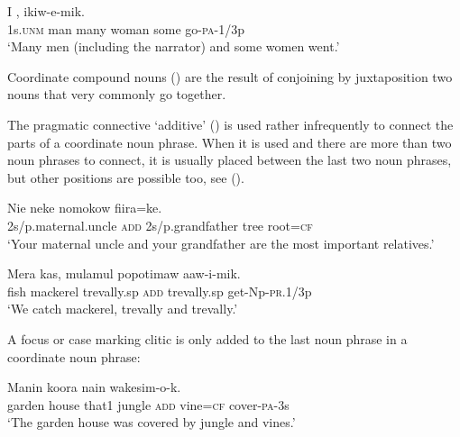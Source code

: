 \ea%
\label{ex:x811}
\gll I   ,     ikiw-e-mik. \\
  1s.\textsc{unm}  man  many  woman  some  go-\textsc{pa}-1/3p    \\
\glt`Many men (including the narrator) and some women went.'
\z





Coordinate compound nouns () are the result of conjoining by juxtaposition two nouns that very commonly go together. 

The pragmatic connective  `additive' () is used rather infrequently to connect the parts of a coordinate noun phrase. When it is used and there are more than two noun phrases to connect, it is usually placed between the last two noun phrases, but other positions are possible too, see (). 

\ea%
\label{ex:x812}
\gll Nie    neke  nomokow  fiira=ke. \\
    2s/p.maternal.uncle  \textsc{add}  2s/p.grandfather  tree  root=\textsc{cf}  \\
\glt`Your maternal uncle and your grandfather are the most important relatives.'
\z





\ea%
\label{ex:x814}
\gll Mera  kas,  mulamul    popotimaw  aaw-i-mik. \\
   fish  mackerel  trevally.sp  \textsc{add}  trevally.sp  get-Np-\textsc{pr}.1/3p   \\
\glt`We catch mackerel,   trevally and   trevally.'
\z





A focus or case marking clitic is only added to the last noun phrase in a coordinate noun phrase:

\ea%
\label{ex:x893}
\gll Manin  koora  nain      wakesim-o-k. \\
     garden  house  that1  jungle  \textsc{add}  vine=\textsc{cf}  cover-\textsc{pa}-3s \\
\glt`The garden house was covered by jungle and vines.'
\z






